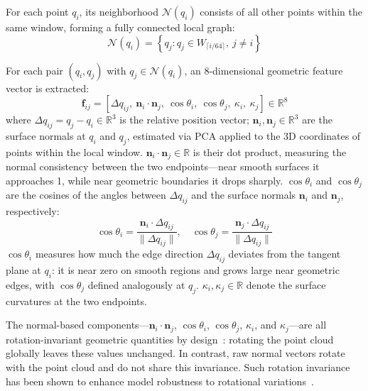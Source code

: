 \documentclass[a4paper,fleqn]{cas-dc}
\begin{document}
For each point $q_i$, its neighborhood $\mathcal{N}(q_i)$ consists of all other points within the same window, forming a fully connected local graph:
\begin{equation}
\mathcal{N}(q_i) = \left\{q_j : q_j \in W_{\lceil i/64 \rceil},\ j \neq i\right\}
\end{equation}

For each pair $(q_i, q_j)$ with $q_j \in \mathcal{N}(q_i)$, an 8-dimensional geometric feature vector is extracted:
\begin{equation}
\mathbf{f}_{ij} = [\Delta q_{ij},\ \mathbf{n}_i \cdot \mathbf{n}_j,\ \cos\theta_i,\ \cos\theta_j,\ \kappa_i,\ \kappa_j] \in \mathbb{R}^8
\end{equation}
where $\Delta q_{ij} = q_j - q_i \in \mathbb{R}^3$ is the relative position vector; $\mathbf{n}_i, \mathbf{n}_j \in \mathbb{R}^3$ are the surface normals at $q_i$ and $q_j$, estimated via PCA applied to the 3D coordinates of points within the local window. $\mathbf{n}_i \cdot \mathbf{n}_j \in \mathbb{R}$ is their dot product, measuring the normal consistency between the two endpoints---near smooth surfaces it approaches 1, while near geometric boundaries it drops sharply. $\cos\theta_i$ and $\cos\theta_j$ are the cosines of the angles between $\Delta q_{ij}$ and the surface normals $\mathbf{n}_i$ and $\mathbf{n}_j$, respectively:
\begin{equation}
\cos\theta_i = \frac{\mathbf{n}_i \cdot \Delta q_{ij}}{\|\Delta q_{ij}\|}, \quad \cos\theta_j = \frac{\mathbf{n}_j \cdot \Delta q_{ij}}{\|\Delta q_{ij}\|}
\end{equation}
$\cos\theta_i$ measures how much the edge direction $\Delta q_{ij}$ deviates from the tangent plane at $q_i$: it is near zero on smooth regions and grows large near geometric edges, with $\cos\theta_j$ defined analogously at $q_j$. $\kappa_i, \kappa_j \in \mathbb{R}$ denote the surface curvatures at the two endpoints.

The normal-based components---$\mathbf{n}_i \cdot \mathbf{n}_j$, $\cos\theta_i$, $\cos\theta_j$, $\kappa_i$, and $\kappa_j$---are all rotation-invariant geometric quantities by design~\cite{clusterNet, riconv}: rotating the point cloud globally leaves these values unchanged. In contrast, raw normal vectors rotate with the point cloud and do not share this invariance. Such rotation invariance has been shown to enhance model robustness to rotational variations~\cite{clusterNet, riconv}.
\end{document}
